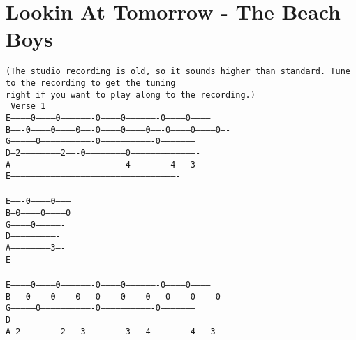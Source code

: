 \newpage
\section{Lookin At Tomorrow - The Beach Boys}
\label{Lookin At Tomorrow - The Beach Boys}
\texttt{(The\ studio\ recording\ is\ old,\ so\ it\ sounds\ higher\ than\ standard.\ Tune\ to\ the\ recording\ to\ get\ the\ tuning\\
right\ if\ you\ want\ to\ play\ along\ to\ the\ recording.)\\
\lbrack\ Verse\ 1\rbrack\\
E-----------0-----------0-------------------0-----------0-------------------0-----------0------------\\
B-------0-----------0-----------0-------0-----------0-----------0-------0-----------0-----------0----\\
G---------------0-------------------------------0-------------------------------0--------------------\\
D---2-----------------------2-------0-----------------------0----------------------------------------\\
A-------------------------------------------------------------------4-----------------------4-------3\\
E----------------------------------------------------------------------------------------------------\\
\\
E-------0-----------0--------\\
B---0-----------0-----------0\\
G-----------0----------------\\
D----------------------------\\
A-----------------------3----\\
E----------------------------\\
\\
E-----------0-----------0-------------------0-----------0-------------------0-----------0------------\\
B-------0-----------0-----------0-------0-----------0-----------0-------0-----------0-----------0----\\
G---------------0-------------------------------0-------------------------------0--------------------\\
D----------------------------------------------------------------------------------------------------\\
A---2-----------------------2-------3-----------------------3-------4-----------------------4-------3\\
}
